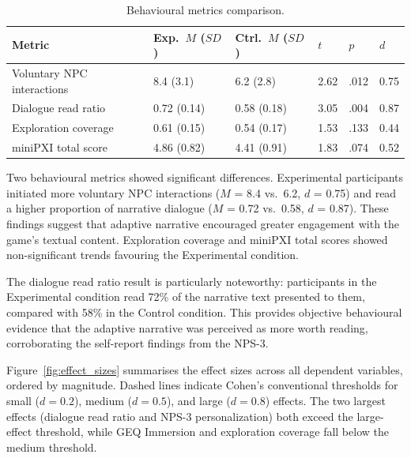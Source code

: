 \begin{table}[H]
\centering
\caption{Behavioural metrics comparison.}
\label{tab:behavioural}
\small
\begin{tabular}{@{}llllll@{}}
\toprule
\textbf{Metric} & \textbf{Exp.\ $M$ ($SD$)} & \textbf{Ctrl.\ $M$ ($SD$)} & $t$ & $p$ & $d$ \\
\midrule
Voluntary NPC interactions & 8.4 (3.1) & 6.2 (2.8) & 2.62 & .012 & 0.75 \\
Dialogue read ratio & 0.72 (0.14) & 0.58 (0.18) & 3.05 & .004 & 0.87 \\
Exploration coverage & 0.61 (0.15) & 0.54 (0.17) & 1.53 & .133 & 0.44 \\
miniPXI total score & 4.86 (0.82) & 4.41 (0.91) & 1.83 & .074 & 0.52 \\
\bottomrule
\end{tabular}
\end{table}

Two behavioural metrics showed significant differences. Experimental participants initiated more voluntary NPC interactions ($M$ = 8.4 vs.\ 6.2, $d$ = 0.75) and read a higher proportion of narrative dialogue ($M$ = 0.72 vs.\ 0.58, $d$ = 0.87). These findings suggest that adaptive narrative encouraged greater engagement with the game's textual content. Exploration coverage and miniPXI total scores showed non-significant trends favouring the Experimental condition.

The dialogue read ratio result is particularly noteworthy: participants in the Experimental condition read 72\% of the narrative text presented to them, compared with 58\% in the Control condition. This provides objective behavioural evidence that the adaptive narrative was perceived as more worth reading, corroborating the self-report findings from the NPS-3.

Figure~\ref{fig:effect_sizes} summarises the effect sizes across all dependent variables, ordered by magnitude. Dashed lines indicate Cohen's conventional thresholds for small ($d = 0.2$), medium ($d = 0.5$), and large ($d = 0.8$) effects. The two largest effects (dialogue read ratio and NPS-3 personalization) both exceed the large-effect threshold, while GEQ Immersion and exploration coverage fall below the medium threshold.

